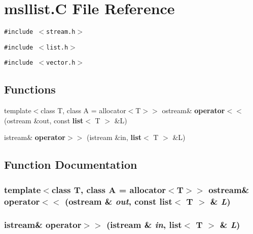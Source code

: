 \section{msllist.C File Reference}
\label{msllist_8C}
{\tt \#include $<$stream.h$>$}\par
{\tt \#include $<$list.h$>$}\par
{\tt \#include $<$vector.h$>$}\par
\subsection*{Functions}
\begin{CompactItemize}
\item 
template$<$class T, class A = allocator$<$T$>$$>$ ostream\& {\bf operator$<$$<$} (ostream \&out, const {\bf list}$<$ T $>$ \&L)
\item 
istream\& {\bf operator$>$$>$} (istream \&in, {\bf list}$<$ T $>$ \&L)
\end{CompactItemize}


\subsection{Function Documentation}
\subsubsection{\setlength{\rightskip}{0pt plus 5cm}template$<$class T, class A = allocator$<$T$>$$>$ ostream\& operator$<$$<$ (ostream \& {\em out}, const {\bf list}$<$ T $>$ \& {\em L})}\label{msllist_8C_a0}


\subsubsection{\setlength{\rightskip}{0pt plus 5cm}istream\& operator$>$$>$ (istream \& {\em in}, {\bf list}$<$ T $>$ \& {\em L})}\label{msllist_8C_a1}


